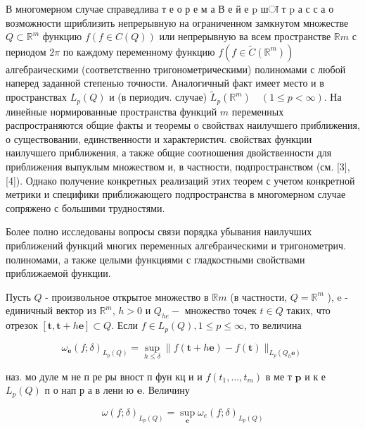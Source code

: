 \documentclass[10pt]{article}
\begin{document}
В многомерном случае справедлива т е о р е м а В е й е $\mathrm{p}$ шा т $\mathrm{p}$ а с с а о возможности шриблизить непрерывную на ограниченном замкнутом множестве $Q \subset \mathbb{R}^{m}$ функцию $f(f \in C(Q))$ или непрерывную ва всем пространстве $\mathbb{R} m$ с периодом $2 \pi$ по каждому переменному функцию $f\left(f \in \tilde{C}\left(\mathbb{R}^{m}\right)\right)$ алгебраическими (соответственно тригонометрическими) полиномами с любой наперед заданной степенью точности. Аналогичный факт имеет место и в пространствах $L_{p}(Q)$ и (в периодич. случае) $\tilde{L}_{p}\left(\mathbb{R}^{m}\right) \quad(1 \leqslant p<\infty)$. На линейные нормированные пространства функций $m$ переменных распространяются общие факты и теоремы о свойствах наилучшего приближения, о существовании, единственности и характеристич. свойствах функции наилучшего приближения, а также общие соотношения двойственности для приближения выпуклым множеством и, в частности, подпространством (см. [3], [4]). Однако получение конкретных реализаций этих теорем с учетом конкретной метрики и специфики приближающего подпространства в многомерном случае сопряжено с большими трудностями.



Более полно исследованы вопросы связи порядка убывания наилучших приближений функций многих переменных алгебраическими и тригонометрич. полиномами, а также целыми функциями с гладкостными свойствами приближаемой функции.



Пусть $Q$ - произвольное открытое множество в $\mathbb{R} m$ (в частности, $Q=\mathbb{R}^{m}$ ), e - единичный вектор из $\mathbb{R}^{m}$, $h>0$ и $Q_{h e}-$ множество точек $t \in Q$ таких, что отрезок $[\boldsymbol{t}, \boldsymbol{t}+h \boldsymbol{e}] \subset Q$. Если $f \in L_{p}(Q), 1 \leqslant p \leqslant \infty$, то величина



\[

\omega_{\boldsymbol{e}}(f ; \delta)_{L_{p}(Q)}=\sup _{h \leqslant \delta}\|f(\boldsymbol{t}+h \boldsymbol{e})-f(\boldsymbol{t})\|_{L_{p}\left(Q_{h} \boldsymbol{e}\right)}

\]



наз. мо дуле м не п ре ры вност п фун кц и и $f\left(t_{1}, \ldots, t_{m}\right)$ в ме т $\mathbf{p}$ и к е $L_{p}(Q)$ п о нап р а в лени ю $\boldsymbol{e}$. Величину



\[

\omega(f ; \delta)_{L_{p}(Q)}=\sup _{\boldsymbol{e}} \omega_{e}(f ; \delta)_{L_{p}(Q)}

\]
\end{document}
